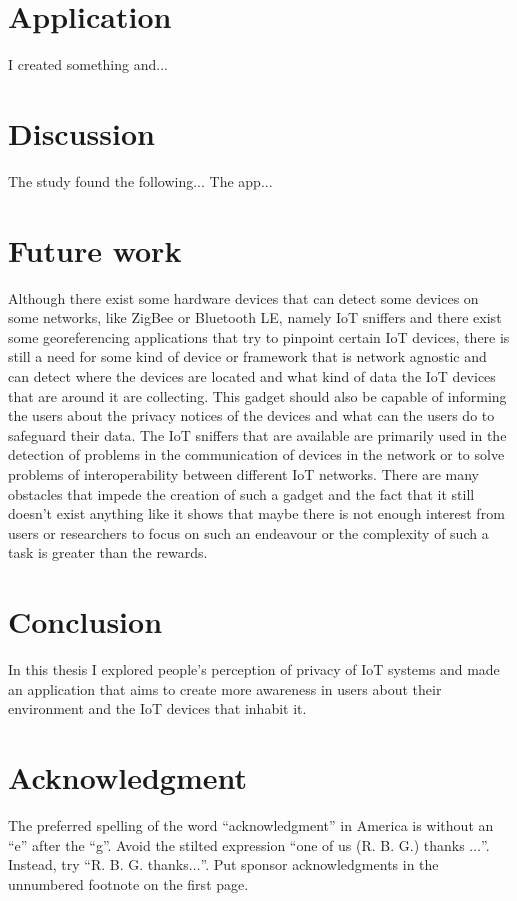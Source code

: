 \documentclass[conference]{IEEEtran}
\begin{document}
\section{Application}

I created something and...

\section{Discussion}

The study found the following... The app...

\section{Future work}

Although there exist some hardware devices that can detect some devices
on some networks, like ZigBee or Bluetooth LE, namely IoT sniffers and
there exist some georeferencing applications that try to pinpoint certain
IoT devices, there is still a need for some kind of device or framework
that is network agnostic and can detect where the devices are located and
what kind of data the IoT devices that are around it are collecting.
This gadget should also be capable of informing the users about the privacy
notices of the devices and what can the users do to safeguard their data.
The IoT sniffers that are available are primarily used in the detection of
problems in the communication of devices in the network or to solve problems
of interoperability between different IoT networks. There are many obstacles
that impede the creation of such a gadget and the fact that it still doesn't
exist anything like it shows that maybe there is not enough interest from
users or researchers to focus on such an endeavour or the complexity
of such a task is greater than the rewards.

\section{Conclusion}

In this thesis I explored people's perception of privacy of IoT systems and
made an application that aims to create more awareness in users about their
environment and the IoT devices that inhabit it.

\section*{Acknowledgment}

The preferred spelling of the word ``acknowledgment'' in America is without
an ``e'' after the ``g''. Avoid the stilted expression ``one of us (R. B.
G.) thanks $\ldots$''. Instead, try ``R. B. G. thanks$\ldots$''. Put sponsor
acknowledgments in the unnumbered footnote on the first page.



\end{document}
